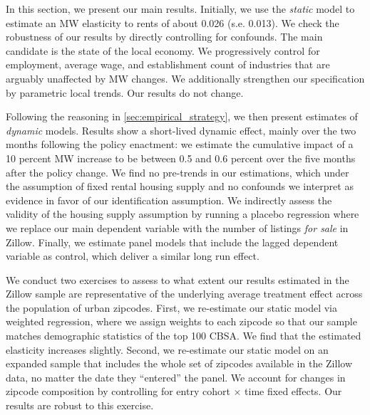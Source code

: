 
In this section, we present our main results. Initially, we use the \textit{static} model
to estimate an MW elasticity to rents of about 0.026 (s.e. 0.013). We check the
robustness of our results by directly controlling for confounds. The main candidate is 
the state of the local economy. We progressively control for employment, average wage, 
and establishment count of industries that are arguably unaffected by MW changes. 
We additionally strengthen our specification by  parametric local trends. Our results do not 
change.

Following the reasoning in \autoref{sec:empirical_strategy}, we then present estimates of 
\textit{dynamic} models. Results show a short-lived dynamic effect, mainly over the two
months following the policy enactment: we estimate the cumulative impact of a 10 percent MW increase 
to be between 0.5 and 0.6 percent over the five months after the policy change. 
We find no pre-trends in our estimations, which under the assumption of fixed rental housing 
supply and no confounds we interpret as evidence in favor of our identification assumption. 
We indirectly assess the validity of the housing supply assumption by running a placebo 
regression where we replace our main dependent variable with the number of listings \textit{for sale} in Zillow. 
Finally, we estimate panel models that include the lagged dependent variable as control,
which deliver a similar long run effect.







We conduct two exercises to assess to what extent our results estimated in the Zillow sample 
are representative of the underlying average treatment effect across the population of urban
zipcodes. First, we re-estimate our static model via weighted regression, where we assign 
weights to each zipcode so that our sample matches demographic statistics of the top 100 
CBSA. We find that the estimated elasticity increases slightly. Second, we re-estimate our 
static model on an expanded sample that includes the whole set of zipcodes available in the 
Zillow data, no matter the date they ``entered'' the panel. We account for changes in zipcode 
composition by controlling for entry cohort $\times$ time fixed effects. Our results are robust 
to this exercise.

